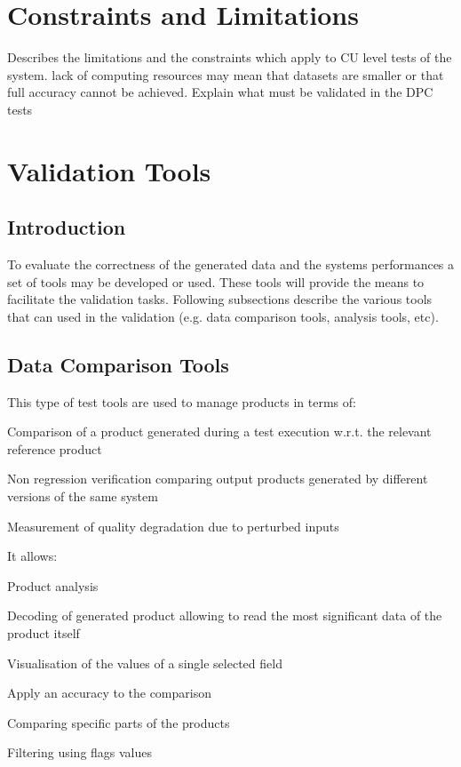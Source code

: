 \section{Constraints and Limitations}

Describes the limitations and the constraints which apply to CU level tests of the system. lack of computing resources may mean that datasets are smaller or that full accuracy cannot be achieved. Explain what must be validated in the DPC tests




\section{Validation Tools}
\subsection{Introduction}

To evaluate the correctness of the generated data and the systems performances a set of tools may be developed or used. These
tools will provide the means to facilitate the validation tasks. 
Following subsections describe the various tools that can used in the \product validation (e.g. data comparison tools, analysis tools, etc).

\subsection{Data Comparison Tools}
This type of test tools are used to manage products in terms of:
\begin{itemize_single}
\item Comparison of a product generated during a test execution w.r.t. the relevant reference product
\item Non regression verification comparing output products generated by different versions of the same system
\item Measurement of quality degradation due to perturbed inputs
\end{itemize_single}
It allows:
\begin{itemize_single}
\item Product analysis
\item Decoding of generated product allowing to read the most significant data of the product itself
\item Visualisation of the values of a single selected field
\item Apply an accuracy to the comparison
\item Comparing specific parts of the products
\item Filtering using flags values
\end{itemize_single}

